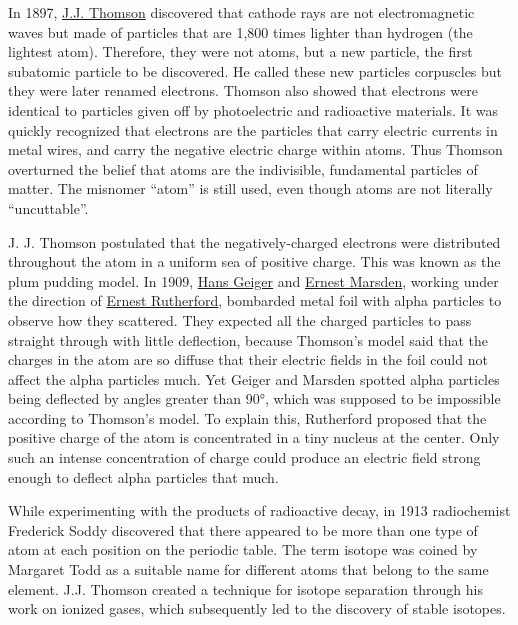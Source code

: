In 1897, \href{https://en.wikipedia.org/wiki/J._J._Thomson}{J.J.
Thomson} discovered that cathode rays are not electromagnetic waves but
made of particles that are 1,800 times lighter than hydrogen (the
lightest atom). Therefore, they were not atoms, but a new particle, the
first subatomic particle to be discovered. He called these new particles
corpuscles but they were later renamed electrons. Thomson also showed
that electrons were identical to particles given off by photoelectric
and radioactive materials. It was quickly recognized that electrons are
the particles that carry electric currents in metal wires, and carry the
negative electric charge within atoms. Thus Thomson overturned the
belief that atoms are the indivisible, fundamental particles of matter.
The misnomer ``atom'' is still used, even though atoms are not literally
``uncuttable''.

J. J. Thomson postulated that the negatively-charged electrons were
distributed throughout the atom in a uniform sea of positive charge.
This was known as the plum pudding model. In 1909,
\href{https://en.wikipedia.org/wiki/Hans_Geiger}{Hans Geiger} and
\href{https://en.wikipedia.org/wiki/Ernest_Marsden}{Ernest Marsden},
working under the direction of
\href{https://en.wikipedia.org/wiki/Ernest_Rutherford}{Ernest
Rutherford}, bombarded metal foil with alpha particles to observe how
they scattered. They expected all the charged particles to pass straight
through with little deflection, because Thomson's model said that the
charges in the atom are so diffuse that their electric fields in the
foil could not affect the alpha particles much. Yet Geiger and Marsden
spotted alpha particles being deflected by angles greater than 90°,
which was supposed to be impossible according to Thomson's model. To
explain this, Rutherford proposed that the positive charge of the atom
is concentrated in a tiny nucleus at the center. Only such an intense
concentration of charge could produce an electric field strong enough to
deflect alpha particles that much.

While experimenting with the products of radioactive decay, in 1913
radiochemist Frederick Soddy discovered that there appeared to be more
than one type of atom at each position on the periodic table. The term
isotope was coined by Margaret Todd as a suitable name for different
atoms that belong to the same element. J.J. Thomson created a technique
for isotope separation through his work on ionized gases, which
subsequently led to the discovery of stable isotopes.

